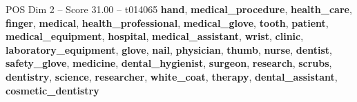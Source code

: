 \begin{textsample}{POS Dim 2 – Score 31.00 – t014065}  \label{ex:f2_pos_007}
\textbf{hand}, \textbf{medical\_procedure}, \textbf{health\_care}, \textbf{finger}, \textbf{medical}, \textbf{health\_professional}, \textbf{medical\_glove}, \textbf{tooth}, \textbf{patient}, \textbf{medical\_equipment}, \textbf{hospital}, \textbf{medical\_assistant}, \textbf{wrist}, \textbf{clinic}, \textbf{laboratory\_equipment}, \textbf{glove}, \textbf{nail}, \textbf{physician}, \textbf{thumb}, \textbf{nurse}, \textbf{dentist}, \textbf{safety\_glove}, \textbf{medicine}, \textbf{dental\_hygienist}, \textbf{surgeon}, \textbf{research}, \textbf{scrubs}, \textbf{dentistry}, \textbf{science}, \textbf{researcher}, \textbf{white\_coat}, \textbf{therapy}, \textbf{dental\_assistant}, \textbf{cosmetic\_dentistry}

\end{textsample}
